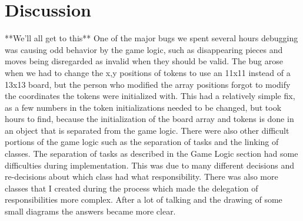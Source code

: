 \documentclass{article}
\begin{document}
\section{Discussion}
**We'll all get to this**
	One of the major bugs we spent several hours debugging was causing odd behavior by the game logic, such as disappearing pieces and moves being disregarded as invalid when they should be valid. The bug arose when we had to change the x,y positions of tokens to use an 11x11 instead of a 13x13 board, but the person who modified the array positions forgot to modify the coordinates the tokens were initialized with. This had a relatively simple fix, as a few numbers in the token initializations needed to be changed, but took hours to find, because the initialization of the board array and tokens is done in an object that is separated from the game logic. 
	There were also other difficult portions of the game logic such as the separation of tasks and the linking of classes. The separation of tasks as described in the Game Logic section had some difficulties during implementation. This was due to many different decisions and re-decisions about which class had what responsibility. There was also more classes that I created during the process which made the delegation of responsibilities more complex. After a lot of talking and the drawing of some small diagrams the answers became more clear.
\end{document}
